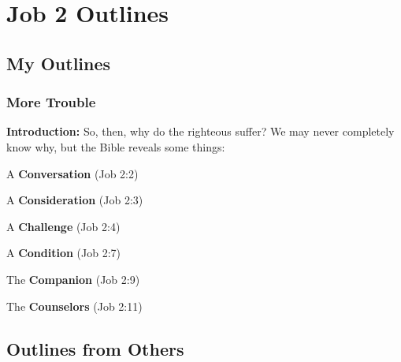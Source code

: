\section{Job 2 Outlines}

\subsection{My Outlines}

\subsubsection{More Trouble}
\textbf{Introduction:} So, then, why do the righteous suffer? We may never completely know why, but the Bible reveals some things:%
\begin{compactenum}[I.][19]
    \item  A \textbf{Conversation} (Job 2:2)
    \item  A \textbf{Consideration} (Job 2:3)
    \item  A \textbf{Challenge} (Job 2:4)
    \item  A \textbf{Condition} (Job 2:7)
    \item  The \textbf{Companion} (Job 2:9)
    \item  The \textbf{Counselors} (Job 2:11)
\end{compactenum}

\subsection{Outlines from Others}



